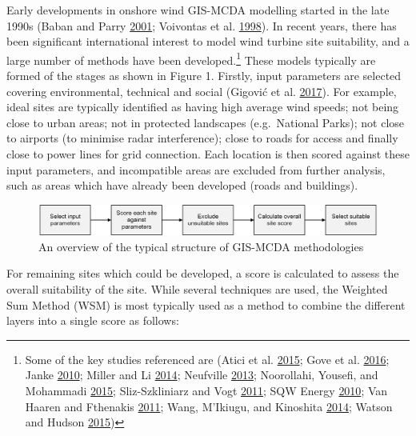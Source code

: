 \documentclass[a4paper,]{article}
\let\rmarkdownfootnote\footnote%
\def\footnote{\protect\rmarkdownfootnote}
\theoremstyle{definition}
\theoremstyle{definition}
\theoremstyle{remark}
\begin{document}
{Early developments in onshore wind GIS-MCDA modelling started in the
late 1990s (Baban and Parry \protect\hyperlink{ref-Baban2001}{2001};
Voivontas et al. \protect\hyperlink{ref-Voivontas1998}{1998}). In recent
years, there has been significant international interest to model wind
turbine site suitability, and a large number of methods have been
developed.\footnote{Some of the key studies referenced are (Atici et al.
  \protect\hyperlink{ref-Atici2015}{2015}; Gove et al.
  \protect\hyperlink{ref-Gove2016a}{2016}; Janke
  \protect\hyperlink{ref-Janke2010}{2010}; Miller and Li
  \protect\hyperlink{ref-Miller2014}{2014}; Neufville
  \protect\hyperlink{ref-Neufville2013}{2013}; Noorollahi, Yousefi, and
  Mohammadi \protect\hyperlink{ref-Noorollahi2015}{2015};
  Sliz-Szkliniarz and Vogt
  \protect\hyperlink{ref-Sliz-Szkliniarz2011}{2011}; SQW Energy
  \protect\hyperlink{ref-SQWEnergy2010}{2010}; Van Haaren and Fthenakis
  \protect\hyperlink{ref-VanHaaren2011}{2011}; Wang, M'Ikiugu, and
  Kinoshita \protect\hyperlink{ref-Wang2014}{2014}; Watson and Hudson
  \protect\hyperlink{ref-Watson2015}{2015})} These models typically are
formed of the stages as shown in Figure 1. Firstly, input parameters are
selected covering environmental, technical and social (Gigović et al.
\protect\hyperlink{ref-Gigovic2017}{2017}). For example, ideal sites are
typically identified as having high average wind speeds; not being close
to urban areas; not in protected landscapes (e.g.~National Parks); not
close to airports (to minimise radar interference); close to roads for
access and finally close to power lines for grid connection. Each
location is then scored against these input parameters, and incompatible
areas are excluded from further analysis, such as areas which have
already been developed (roads and buildings).

\begin{figure}[!h]
\includegraphics[width=1\linewidth]{figures/MethodologyFlowChart} \caption{An overview of the typical structure of GIS-MCDA methodologies}\label{fig:Flowchart}
\end{figure}

For remaining sites which could be developed, a score is calculated to
assess the overall suitability of the site. While several techniques are
used, the Weighted Sum Method (WSM) is most typically used as a method
to combine the different layers into a single score as follows:

}
\end{document}

